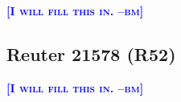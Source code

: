 \documentclass{article} %
\newcommand{\bmcomment}[1]{\textcolor{blue}{\textsc{\textbf{[#1 --bm]}}}}
\begin{document}
\bmcomment{I will fill this in.}


\subsection{Reuter 21578 (R52)}

\bmcomment{I will fill this in.}

\end{document}
